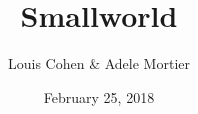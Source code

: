 \documentclass[11pt]{beamer}
\author{Louis Cohen \& Adele Mortier}
\title{Smallworld}
\institute{MPRI 2017}
\date{February 25, 2018}
\begin{document}
\begin{frame}
\titlepage
\end{frame}

\begin{frame}
\tableofcontents
\end{frame}




\end{document}
